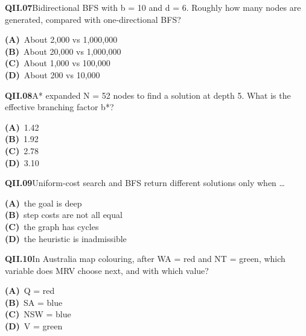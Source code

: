 \documentclass[11pt]{article}
\begin{document}
\begin{tcolorbox}[enhanced,breakable,colback=white,colframe=navyL,arc=2mm,boxrule=0.7pt,left=3mm,right=3mm,top=2mm,bottom=2mm]
\textbf{\color{navy}QII.07}\quad Bidirectional BFS with b = 10 and d = 6. Roughly how many nodes are generated, compared with one-directional BFS?\hfill{}\par\smallskip
{\small \textbf{\color{navyL}(A)}\ About 2,000 vs 1,000,000\\[1pt]\textbf{\color{navyL}(B)}\ About 20,000 vs 1,000,000\\[1pt]\textbf{\color{navyL}(C)}\ About 1,000 vs 100,000\\[1pt]\textbf{\color{navyL}(D)}\ About 200 vs 10,000}
\end{tcolorbox}
\begin{tcolorbox}[enhanced,breakable,colback=white,colframe=navyL,arc=2mm,boxrule=0.7pt,left=3mm,right=3mm,top=2mm,bottom=2mm]
\textbf{\color{navy}QII.08}\quad A* expanded N = 52 nodes to find a solution at depth 5. What is the effective branching factor b*?\hfill{}\par\smallskip
{\small \textbf{\color{navyL}(A)}\ 1.42\\[1pt]\textbf{\color{navyL}(B)}\ 1.92\\[1pt]\textbf{\color{navyL}(C)}\ 2.78\\[1pt]\textbf{\color{navyL}(D)}\ 3.10}
\end{tcolorbox}
\begin{tcolorbox}[enhanced,breakable,colback=white,colframe=navyL,arc=2mm,boxrule=0.7pt,left=3mm,right=3mm,top=2mm,bottom=2mm]
\textbf{\color{navy}QII.09}\quad Uniform-cost search and BFS return different solutions only when \dots{}\hfill{}\par\smallskip
{\small \textbf{\color{navyL}(A)}\ the goal is deep\\[1pt]\textbf{\color{navyL}(B)}\ step costs are not all equal\\[1pt]\textbf{\color{navyL}(C)}\ the graph has cycles\\[1pt]\textbf{\color{navyL}(D)}\ the heuristic is inadmissible}
\end{tcolorbox}
\begin{tcolorbox}[enhanced,breakable,colback=white,colframe=navyL,arc=2mm,boxrule=0.7pt,left=3mm,right=3mm,top=2mm,bottom=2mm]
\textbf{\color{navy}QII.10}\quad In Australia map colouring, after WA = red and NT = green, which variable does MRV choose next, and with which value?\hfill{}\par\smallskip
{\small \textbf{\color{navyL}(A)}\ Q = red\\[1pt]\textbf{\color{navyL}(B)}\ SA = blue\\[1pt]\textbf{\color{navyL}(C)}\ NSW = blue\\[1pt]\textbf{\color{navyL}(D)}\ V = green}
\end{tcolorbox}
\end{document}
